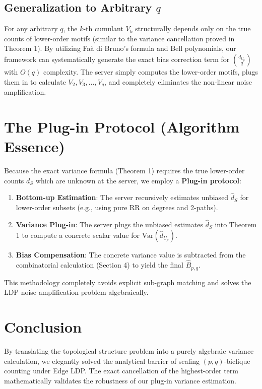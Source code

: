 \documentclass[11pt,a4paper]{article}
\begin{document}
\subsection{Generalization to Arbitrary $q$}
For any arbitrary $q$, the $k$-th cumulant $V_k$ structurally depends only on the true counts of lower-order motifs (similar to the variance cancellation proved in Theorem 1). By utilizing Faà di Bruno's formula and Bell polynomials, our framework can systematically generate the exact bias correction term for $\binom{d_{U_p}}{q}$ with $O(q)$ complexity. The server simply computes the lower-order motifs, plugs them in to calculate $V_2, V_3, \dots, V_q$, and completely eliminates the non-linear noise amplification.

\section{The Plug-in Protocol (Algorithm Essence)}
Because the exact variance formula (Theorem 1) requires the true lower-order counts $d_S$ which are unknown at the server, we employ a \textbf{Plug-in protocol}:
\begin{enumerate}
    \item \textbf{Bottom-up Estimation}: The server recursively estimates unbiased $\hat{d}_S$ for lower-order subsets (e.g., using pure RR on degrees and 2-paths).
    \item \textbf{Variance Plug-in}: The server plugs the unbiased estimates $\hat{d}_S$ into Theorem 1 to compute a concrete scalar value for $\text{Var}(\hat{d}_{U_p})$.
    \item \textbf{Bias Compensation}: The concrete variance value is subtracted from the combinatorial calculation (Section 4) to yield the final $\hat{B}_{p,q}$.
\end{enumerate}
This methodology completely avoids explicit sub-graph matching and solves the LDP noise amplification problem algebraically.

\section{Conclusion}
By translating the topological structure problem into a purely algebraic variance calculation, we elegantly solved the analytical barrier of scaling $(p,q)$-biclique counting under Edge LDP. The exact cancellation of the highest-order term mathematically validates the robustness of our plug-in variance estimation.
\end{document}
